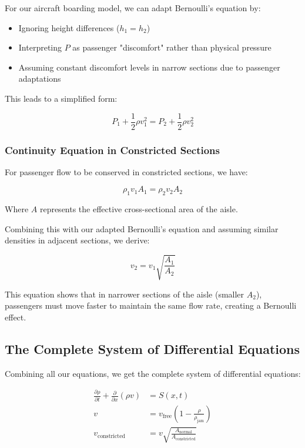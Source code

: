 \documentclass[a4paper,12pt]{article}
\begin{document}
For our aircraft boarding model, we can adapt Bernoulli's equation by:
\begin{itemize}
    \item Ignoring height differences ($h_1 = h_2$)
    \item Interpreting $P$ as passenger "discomfort" rather than physical pressure
    \item Assuming constant discomfort levels in narrow sections due to passenger adaptations
\end{itemize}

This leads to a simplified form:

\begin{equation}
P_1 + \frac{1}{2}\rho v_1^2 = P_2 + \frac{1}{2}\rho v_2^2
\end{equation}

\subsubsection{Continuity Equation in Constricted Sections}

For passenger flow to be conserved in constricted sections, we have:

\begin{equation}
\rho_1 v_1 A_1 = \rho_2 v_2 A_2
\end{equation}

Where $A$ represents the effective cross-sectional area of the aisle.

Combining this with our adapted Bernoulli's equation and assuming similar densities in adjacent sections, we derive:

\begin{equation}
v_2 = v_1\sqrt{\frac{A_1}{A_2}}
\end{equation}

This equation shows that in narrower sections of the aisle (smaller $A_2$), passengers must move faster to maintain the same flow rate, creating a Bernoulli effect.

\subsection{The Complete System of Differential Equations}

Combining all our equations, we get the complete system of differential equations:

\begin{align}
\frac{\partial \rho}{\partial t} + \frac{\partial}{\partial x}(\rho v) &= S(x,t) \\
v &= v_{\text{free}} \left(1 - \frac{\rho}{\rho_{\text{jam}}}\right) \\
v_{\text{constricted}} &= v\sqrt{\frac{A_{\text{normal}}}{A_{\text{constricted}}}}
\end{align}
\end{document}
